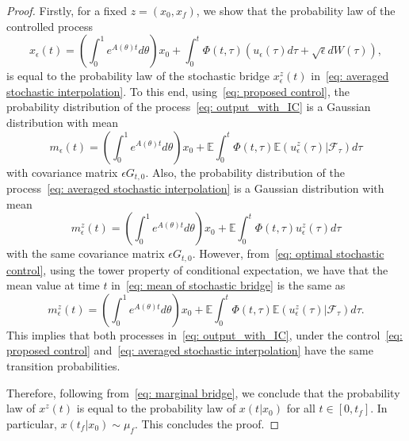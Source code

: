 \documentclass[12pt]{amsart}
\renewcommand{\(}{\left (}
\renewcommand{\)}{\right )}
\numberwithin{equation}{section}
\begin{document}
\begin{proof}

 Firstly, for a fixed $z=(x_0,x_f)$, we show that the probability law of the controlled process 
\begin{equation}\label{eq: output_with_IC}
 x_{\epsilon}(t)=\left(\int_0^1e^{A(\theta)t}d\theta\right) x_0+\int_0^t \Phi(t,\tau)(u_{\epsilon}(\tau)d\tau +\sqrt{\epsilon} dW(\tau)),    
\end{equation}
is equal to the probability law of the stochastic bridge $x_{\epsilon}^z(t)$ in~\eqref{eq: averaged stochastic interpolation}. To this end,  using~\eqref{eq: proposed control}, the probability distribution of the process~\eqref{eq: output_with_IC} is a Gaussian distribution with mean
\begin{equation}\label{eq: controlled mean 1}
m_{\epsilon}(t)=\left(\int_0^1e^{A(\theta)t}d\theta\right) x_0+\mathbb{E}\int_0^t \Phi(t,\tau)\mathbb{E}(u_{\epsilon}^z(\tau)|\mathcal{F}_{\tau})d\tau    
\end{equation}
with covariance matrix $\epsilon G_{t,0}$. Also, the probability distribution of the process~\eqref{eq: averaged stochastic interpolation} is a Gaussian distribution with mean
\begin{equation}\label{eq: mean of stochastic bridge}
m_{\epsilon}^z(t)=\left(\int_0^1e^{A(\theta)t}d\theta\right) x_0+\mathbb{E}\int_0^t \Phi(t,\tau)u_{\epsilon}^z(\tau)d\tau    
\end{equation}
with the same covariance matrix $\epsilon G_{t,0}$. However, from~\eqref{eq: optimal stochastic control}, using the tower property of conditional expectation, we have that the mean value at time $t$ in~\eqref{eq: mean of stochastic bridge} is the same as  
\begin{equation}\label{eq: conditional mean of stochastic bridge}
m_{\epsilon}^z(t)=\left(\int_0^1e^{A(\theta)t}d\theta\right) x_0+\mathbb{E}\int_0^t \Phi(t,\tau)\mathbb{E}(u_{\epsilon}^z(\tau)|\mathcal{F}_{\tau})d\tau.    
\end{equation}
This implies that both processes in~\eqref{eq: output_with_IC}, under the control~\eqref{eq: proposed control} and~\eqref{eq: averaged stochastic interpolation} have the same transition probabilities. 

Therefore, following from~\eqref{eq: marginal bridge}, we conclude that the probability law of $ x^z(t)$ is equal to the probability law of $x(t|x_0)$ for all $t \in [0, t_f]$. In particular, $x(t_f|x_0)\sim\mu_f$. This concludes the proof.
\end{proof}
\end{document}
